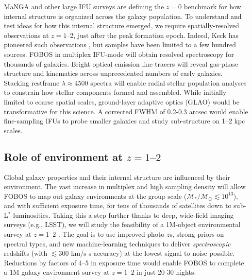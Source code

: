MaNGA \citep{bundy15} and other large IFU surveys are defining the $z=0$ benchmark for how internal structure is organized across the galaxy population.  To understand and test ideas for how this internal structure emerged, we require spatially-resolved observations at $z = 1$--2, just after the peak formation epoch.  Indeed, Keck has pioneered such observations \citep[e.g.,][]{erb04, miller11,law09}, but samples have been limited to a few hundred sources.  FOBOS in multiplex IFU-mode will obtain resolved spectroscopy for thousands of galaxies.  Bright optical emission line tracers will reveal gas-phase structure and kinematics across unprecedented numbers of early galaxies.  Stacking restframe $\lambda \approx 4500$ spectra will enable radial stellar population analyses to constrain how stellar components formed and assembled.  While initially limited to coarse spatial scales, ground-layer adaptive optics (GLAO) would be transformative for this science.  A corrected FWHM of 0.2-0.3 arcsec would enable fine-sampling IFUs to probe smaller galaxies and study sub-structure on 1--2 kpc scales.


\subsection{Role of environment at $z=1$--$2$ }

Global galaxy properties and their internal structure are influenced by their environment.  The vast increase in multiplex and high sampling density will allow FOBOS to map out galaxy environments at the group scale ($\mathcal{M_\ast/M_\odot}
\lesssim 10^{13}$), and with sufficient exposure time, for tens of thousands of satellites down to sub-L$^*$
luminosities.  Taking this a step further thanks to deep, wide-field imaging surveys (e.g., LSST), we will study the
feasibility of a 1M-object environmental survey at $z=1$--$2$ .  The goal is to use improved photo-$z$s, strong priors
on spectral types, and new machine-learning techniques to deliver {\it spectroscopic} redshifts (with $\lesssim$300
km/s s accuracy) at the lowest signal-to-noise possible. Reductions by factors of 4--5 in exposure time would enable
FOBOS to complete a 1M galaxy environment survey at $z=1$--$2$ in just 20-30 nights.


\noindent{}


